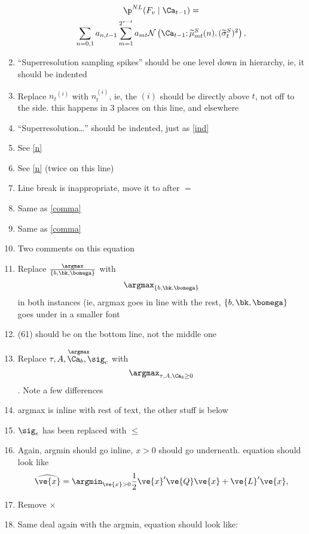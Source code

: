 \begin{enumerate}
\begin{multline*} 
\p^{NL}(F_v \mid \Ca_{t-1}) =\\ \sum_{n=0,1} a_{n,t-1}
\sum_{m=1}^{2^{v-t}} a_{mt} \mathcal{N}\left(\Ca_{t-1}; \widetilde{\mu}^{S}_{mt}(n),(\widetilde{\sigma}^S_t)^2 \right), %
\end{multline*}
\item ``Superresolution sampling spikes'' should be one level down in hierarchy, ie, it should be indented \label{ind}
\item Replace ${n_t}^{(i)}$ with $n_t^{(i)}$, ie, the $(i)$ should be directly above $t$, not off to the side.  this happens in 3 places on this line, and elsewhere \label{n}
\item ``Superresolution\dots'' should be indented, just as \ref{ind}
\item See \ref{n}
\item See \ref{n} (twice on this line)
\item Line break is inappropriate, move it to after $=$
\item Same as \ref{comma}
\item Same as \ref{comma}
\item Two comments on this equation
\ita
\item Replace $\frac{\argmax}{\{b,\bk,\bomega\}}$ with $$\argmax_{\{b,\bk,\bomega\}}$$ in both instances (ie, argmax goes in line with the rest, $\{b,\bk,\bomega\}$ goes under in a smaller font
\item (61) should be on the bottom line, not the middle one
\itb
\item Replace $\overset{\argmax}{\tau,A,\Ca_b,\sig_c}$ with $$\argmax_{\tau,A,\Ca_b\geq 0}$$.  Note a few differences
\ena
\item argmax is inline with rest of text, the other stuff is below
\item $\sig_c$ has been replaced with $\leq$
\enb
\item Again, argmin should go inline, $x>0$ should go underneath.  equation should look like
\begin{align*} 
\widehat{\ve{x}} = \argmin_{\ve{x} > 0} \frac{1}{2}\ve{x}' \ve{Q} \ve{x} + \ve{L}' \ve{x},
\end{align*}
\item Remove $\times$
\item Same deal again with the argmin, equation should look like:
\begin{equation*}
\begin{split}

\end{split}
\end{equation*}
\end{enumerate}
